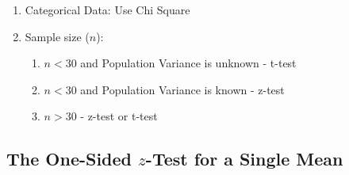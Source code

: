 \begin{enumerate}
    \begin{enumerate}
        \item Categorical Data: Use Chi Square
        \hfill \cite{ctl.unm.edu/assets/docs/resources/hypothesis-testing-sheet.pdf}

        \item Sample size ($n$):
        \begin{enumerate}
            \item $n < 30$ and Population Variance is unknown - t-test
            \hfill \cite{ctl.unm.edu/assets/docs/resources/hypothesis-testing-sheet.pdf}

            \item $n < 30$ and Population Variance is known - z-test
            \hfill \cite{ctl.unm.edu/assets/docs/resources/hypothesis-testing-sheet.pdf}

            \item $n > 30$ - z-test or t-test
            \hfill \cite{ctl.unm.edu/assets/docs/resources/hypothesis-testing-sheet.pdf}
        \end{enumerate}
    \end{enumerate}
\end{enumerate}



\subsection{The One-Sided $z$-Test for a Single Mean}

